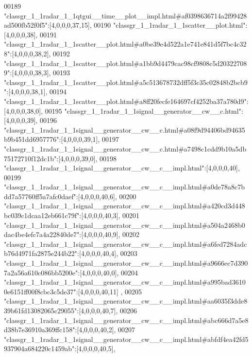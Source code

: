 \begin{DoxyCode}
00189 \textcolor{stringliteral}{"classgr\_1\_1radar\_1\_1qtgui\_\_time\_\_plot\_\_impl.html#af0398636714a2f99428ad500fb52f0f5"}:[4,0,0,0,37,15],
00190 \textcolor{stringliteral}{"classgr\_1\_1radar\_1\_1scatter\_\_plot.html"}:[4,0,0,0,38],
00191 \textcolor{stringliteral}{"classgr\_1\_1radar\_1\_1scatter\_\_plot.html#a0be39e4d522a1e741e841d5f7bc4c328"}:[4,0,0,0,38,2],
00192 \textcolor{stringliteral}{"classgr\_1\_1radar\_1\_1scatter\_\_plot.html#a1bb9d4479cac98cf9808c5d203227089"}:[4,0,0,0,38,3],
00193 \textcolor{stringliteral}{"classgr\_1\_1radar\_1\_1scatter\_\_plot.html#a5c513678732dff5f3c35c02848b2bcb9"}:[4,0,0,0,38,1],
00194 \textcolor{stringliteral}{"classgr\_1\_1radar\_1\_1scatter\_\_plot.html#a8ff20fecfe164697cf4252ba37a780d9"}:[4,0,0,0,38,0],
00195 \textcolor{stringliteral}{"classgr\_1\_1radar\_1\_1signal\_\_generator\_\_cw\_\_c.html"}:[4,0,0,0,39],
00196 \textcolor{stringliteral}{"classgr\_1\_1radar\_1\_1signal\_\_generator\_\_cw\_\_c.html#a08f9d94406bd94635b9b451dd6957776"}:[4,0,0,0,39,1],
00197 \textcolor{stringliteral}{"classgr\_1\_1radar\_1\_1signal\_\_generator\_\_cw\_\_c.html#a7498c1cdd9b10a5db75172710f12dc1b"}:[4,0,0,0,39,0],
00198 \textcolor{stringliteral}{"classgr\_1\_1radar\_1\_1signal\_\_generator\_\_cw\_\_c\_\_impl.html"}:[4,0,0,0,40],
00199 \textcolor{stringliteral}{"classgr\_1\_1radar\_1\_1signal\_\_generator\_\_cw\_\_c\_\_impl.html#a0de78a8c7bdd7a57760ff5a7afc0daef"}:[4,0,0,0,40,6],
00200 \textcolor{stringliteral}{"classgr\_1\_1radar\_1\_1signal\_\_generator\_\_cw\_\_c\_\_impl.html#a420cd3d448bc039c1dcaa12eb661c79f"}:[4,0,0,0,40,3],
00201 \textcolor{stringliteral}{"classgr\_1\_1radar\_1\_1signal\_\_generator\_\_cw\_\_c\_\_impl.html#a504a2468b0dac4be4efc7a4a22840de7"}:[4,0,0,0,40,9],
00202 \textcolor{stringliteral}{"classgr\_1\_1radar\_1\_1signal\_\_generator\_\_cw\_\_c\_\_impl.html#a6fed7284adcb76d4971fa2875e244b22"}:[4,0,0,0,40,4],
00203 \textcolor{stringliteral}{"classgr\_1\_1radar\_1\_1signal\_\_generator\_\_cw\_\_c\_\_impl.html#a9666ec7d3907a2a56a610c086bb5200e"}:[4,0,0,0,40,0],
00204 \textcolor{stringliteral}{"classgr\_1\_1radar\_1\_1signal\_\_generator\_\_cw\_\_c\_\_impl.html#a995bad36100e6151ff00f8cbc3c5de37"}:[4,0,0,0,40,11]
      ,
00205 \textcolor{stringliteral}{"classgr\_1\_1radar\_1\_1signal\_\_generator\_\_cw\_\_c\_\_impl.html#aa6035f3dde839b61fd13082065c29055"}:[4,0,0,0,40,7],
00206 \textcolor{stringliteral}{"classgr\_1\_1radar\_1\_1signal\_\_generator\_\_cw\_\_c\_\_impl.html#abc666d7a5e8d38b7e36910a369ffc158"}:[4,0,0,0,40,2],
00207 \textcolor{stringliteral}{"classgr\_1\_1radar\_1\_1signal\_\_generator\_\_cw\_\_c\_\_impl.html#abfdf4ea42fd5937904a684220c1459ab"}:[4,0,0,0,40,5],

\end{DoxyCode}
